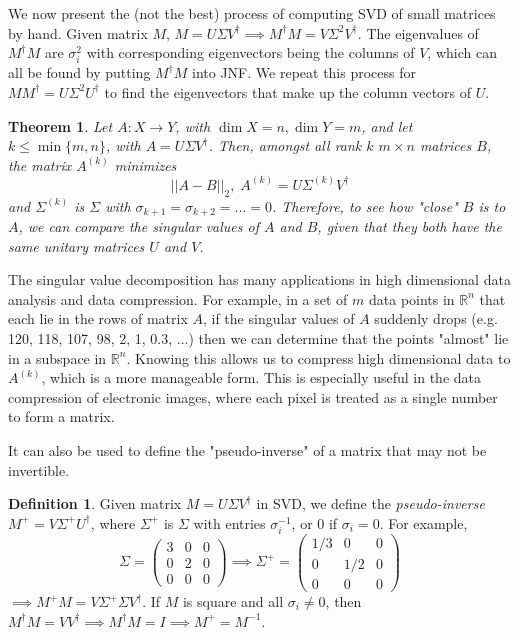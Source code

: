 \documentclass{article}
\newtheorem{theorem}{Theorem}[section]
\theoremstyle{remark}
\theoremstyle{definition}
\newtheorem{definition}{Definition}[section]
\begin{document}
    We now present the (not the best) process of computing SVD of small matrices by hand. Given matrix $M$, $M = U \Sigma V^\dagger \implies M^\dagger M = V \Sigma^2 V^\dagger$. The eigenvalues of $M^\dagger M$ are $\sigma_i^2$ with corresponding eigenvectors being the columns of $V$, which can all be found by putting $M^\dagger M$ into JNF. We repeat this process for $M M^\dagger = U \Sigma^2 U^\dagger$ to find the eigenvectors that make up the column vectors of $U$. 

    \begin{theorem}
    Let $A: X \longrightarrow Y$, with $\dim{X} = n, \dim{Y} = m$, and let $k \leq \min{\{m, n\}}$, with $A = U \Sigma V^\dagger$. Then, amongst all rank $k$ $m \times n$ matrices $B$, the matrix $A^{(k)}$ minimizes 
    \[||A-B||_2, \; A^{(k)} = U \Sigma^{(k)} V^\dagger\]
    and $\Sigma^{(k)}$ is $\Sigma$ with $\sigma_{k+1} = \sigma_{k+2} = ... = 0$. Therefore, to see how "close" $B$ is to $A$, we can compare the singular values of $A$ and $B$, given that they both have the same unitary matrices $U$ and $V$. 
    \end{theorem}

    The singular value decomposition has many applications in high dimensional data analysis and data compression. For example, in a set of $m$ data points in $\mathbb{R}^n$ that each lie in the rows of matrix $A$, if the singular values of $A$ suddenly drops (e.g. 120, 118, 107, 98, 2, 1, 0.3, ...) then we can determine that the points "almost" lie in a subspace in $\mathbb{R}^n$. Knowing this allows us to compress high dimensional data to $A^{(k)}$, which is a more manageable form. This is especially useful in the data compression of electronic images, where each pixel is treated as a single number to form a matrix. 

    It can also be used to define the "pseudo-inverse" of a matrix that may not be invertible. 

    \begin{definition}
    Given matrix $M = U \Sigma V^\dagger$ in SVD, we define the \textit{pseudo-inverse} $M^+ = V \Sigma^+ U^\dagger$, where $\Sigma^+$ is $\Sigma$ with entries $\sigma_i^{-1}$, or $0$ if $\sigma_i = 0$. For example,
    \[ \Sigma = \begin{pmatrix}3&0&0\\0&2&0\\0&0&0\end{pmatrix} \implies \Sigma^+ = \begin{pmatrix}1/3&0&0\\0&1/2&0\\0&0&0\end{pmatrix}\]
    $\implies M^+ M = V \Sigma^+ \Sigma V^\dagger$. If $M$ is square and all $\sigma_i \neq 0$, then $M^\dagger M = V V^\dagger \implies M^\dagger M = I \implies  M^+ = M^{-1}$. 
    \end{definition}
\end{document}
